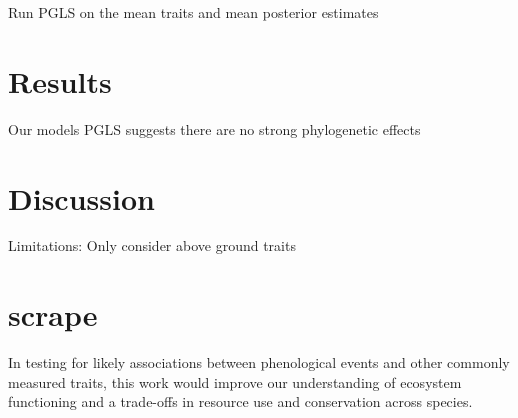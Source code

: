 \documentclass{article}\usepackage[]{graphicx}\usepackage[]{color}
\begin{document}
Run PGLS on the mean traits and mean posterior estimates 

\section{Results}

Our models
PGLS suggests there are no strong phylogenetic effects

 \section{Discussion}


Limitations: Only consider above ground traits



\pagebreak
% 


\section{scrape}
In testing for likely associations between phenological events and other commonly measured traits, this work would improve our understanding of ecosystem functioning and a trade-offs in resource use and conservation across species.  
\end{document}
